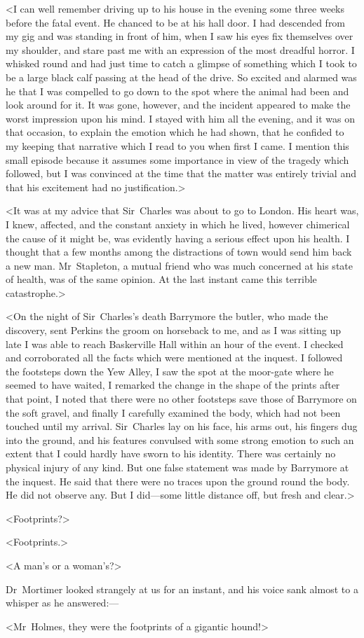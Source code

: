 <I can well remember driving up to his house in the evening some three weeks before the fatal event. He chanced to be at his hall door. I had descended from my gig and was standing in front of him, when I saw his eyes fix themselves over my shoulder, and stare past me with an expression of the most dreadful horror. I whisked round and had just time to catch a glimpse of something which I took to be a large black calf passing at the head of the drive. So excited and alarmed was he that I was compelled to go down to the spot where the animal had been and look around for it. It was gone, however, and the incident appeared to make the worst impression upon his mind. I stayed with him all the evening, and it was on that occasion, to explain the emotion which he had shown, that he confided to my keeping that narrative which I read to you when first I came. I mention this small episode because it assumes some importance in view of the tragedy which followed, but I was convinced at the time that the matter was entirely trivial and that his excitement had no justification.>

<It was at my advice that Sir~Charles was about to go to London. His heart was, I knew, affected, and the constant anxiety in which he lived, however chimerical the cause of it might be, was evidently having a serious effect upon his health. I thought that a few months among the distractions of town would send him back a new man. Mr~Stapleton, a mutual friend who was much concerned at his state of health, was of the same opinion. At the last instant came this terrible catastrophe.>

<On the night of Sir~Charles's death Barrymore the butler, who made the discovery, sent Perkins the groom on horseback to me, and as I was sitting up late I was able to reach Baskerville Hall within an hour of the event. I checked and corroborated all the facts which were mentioned at the inquest. I followed the footsteps down the Yew Alley, I saw the spot at the moor-gate where he seemed to have waited, I remarked the change in the shape of the prints after that point, I noted that there were no other footsteps save those of Barrymore on the soft gravel, and finally I carefully examined the body, which had not been touched until my arrival. Sir~Charles lay on his face, his arms out, his fingers dug into the ground, and his features convulsed with some strong emotion to such an extent that I could hardly have sworn to his identity. There was certainly no physical injury of any kind. But one false statement was made by Barrymore at the inquest. He said that there were no traces upon the ground round the body. He did not observe any. But I did—some little distance off, but fresh and clear.>

<Footprints?>

<Footprints.>

<A man's or a woman's?>

Dr~Mortimer looked strangely at us for an instant, and his voice sank almost to a whisper as he answered:— 

<Mr~Holmes, they were the footprints of a gigantic hound!>

